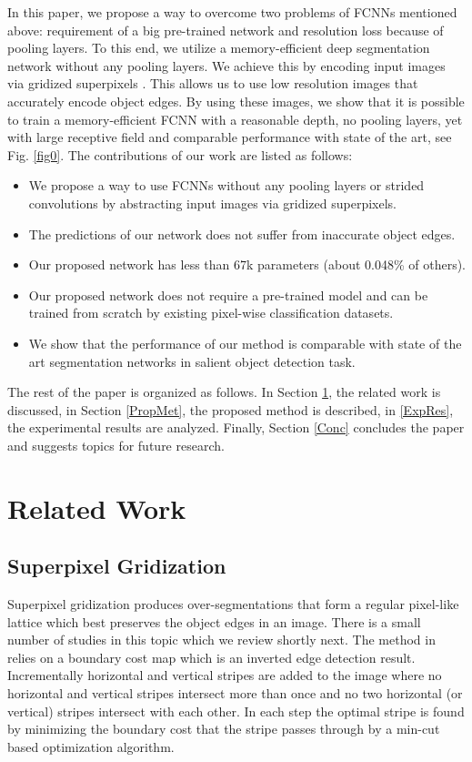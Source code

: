 \documentclass[a4paper,conference]{IEEEtran}
\begin{document}
In this paper, we propose a way to overcome two problems of FCNNs mentioned above: requirement of a big pre-trained network and resolution loss because of pooling layers.
To this end, we utilize a memory-efficient deep segmentation network without any pooling layers.
We achieve this by encoding input images via gridized superpixels \cite{Fu}.
This allows us to use low resolution images that accurately encode object edges.
By using these images, we show that it is possible to train a memory-efficient FCNN with a reasonable depth, no pooling layers, yet with large receptive field and comparable performance with state of the art, see Fig. \ref{fig0}.
The contributions of our work are listed as follows:

\begin{itemize}
  \item We propose a way to use FCNNs without any pooling layers or strided convolutions by abstracting input images via gridized superpixels.
  \item The predictions of our network does not suffer from inaccurate object edges.
  \item Our proposed network has less than 67k parameters (about 0.048\% of others).
  \item Our proposed network does not require a pre-trained model and can be trained from scratch by existing pixel-wise classification datasets.
  \item We show that the performance of our method is comparable with state of the art segmentation networks in salient object detection task.
\end{itemize}

The rest of the paper is organized as follows. In Section \ref{RelWork}, the related work is discussed, in Section \ref{PropMet}, the proposed method is described, in \ref{ExpRes}, the experimental results are analyzed. Finally, Section \ref{Conc} concludes the paper and suggests topics for future research.


\section{Related Work} \label{RelWork}
\subsection{Superpixel Gridization}
Superpixel gridization produces over-segmentations that form a regular pixel-like lattice which best preserves the object edges in an image.
There is a small number of studies in this topic which we review shortly next.
The method in \cite{Moore} relies on a boundary cost map which is an inverted edge detection result. Incrementally horizontal and vertical stripes are added to the image where no horizontal and vertical stripes intersect more than once and no two horizontal (or vertical) stripes intersect with each other. In each step the optimal stripe is found by minimizing the boundary cost that the stripe passes through by a min-cut based optimization algorithm.
\end{document}
